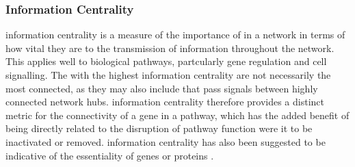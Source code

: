 \subsubsection{Information Centrality}  \label{chapt4:Network_InfoCent}

\Gls{information centrality} is a measure of the importance of  in a network in terms of how vital they are to the transmission of information throughout the network. This applies well to biological \glspl{pathway}, partcularly gene regulation and cell signalling. The  with the highest \gls{information centrality} are not necessarily the most connected, as they may also include  that pass signals between highly connected network hubs. \Gls{information centrality} therefore provides a distinct metric for the connectivity of a gene in a \gls{pathway}, which has the added benefit of being directly related to the disruption of \gls{pathway} function were it to be inactivated or removed.
%
\Gls{information centrality} has also been suggested to be indicative of the essentiality of genes or proteins \citep{Kranthi2013}.%



